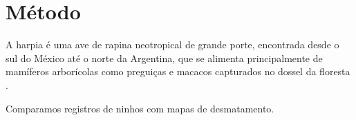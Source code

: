 \section{Método}

A harpia é uma ave de rapina neotropical de grande porte, encontrada desde o sul do México até
o norte da Argentina, que se alimenta principalmente de mamíferos arborícolas como preguiças e
macacos capturados no dossel da floresta \cite{lima2015}.

Comparamos registros de ninhos com mapas de desmatamento.
